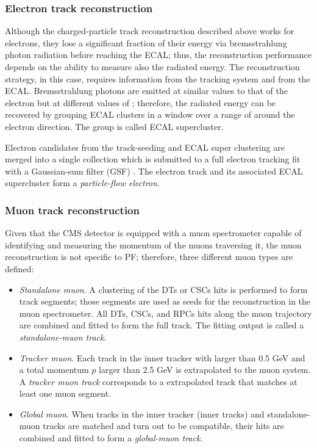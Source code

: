 \subsubsection*{Electron track reconstruction}

Although the charged-particle track reconstruction described above works for electrons, they lose a significant fraction of their energy via bremsstrahlung photon radiation before reaching the ECAL; thus, the reconstruction performance depends on the ability to measure also the radiated energy. The reconstruction strategy, in this case, requires information from the tracking system and from the ECAL. Bremsstrahlung photons are emitted at similar \etac values to that of the electron but at different values of \phic; therefore, the radiated energy can be recovered by grouping ECAL clusters in a \etac window over a range of \phic around the electron direction. The group is called ECAL supercluster.

Electron candidates from the track-seeding and ECAL super clustering are merged into a single collection which is submitted to a full electron tracking fit with a Gaussian-sum filter (GSF) \cite{gsf}. The electron track and its associated ECAL supercluster form a \textit{particle-flow electron}.

\subsubsection*{Muon track reconstruction}

Given that the CMS detector is equipped with a muon spectrometer capable of identifying and measuring the momentum of the muons traversing it, the muon reconstruction is not specific to PF; therefore, three different muon types are defined:

\begin{itemize}
\item \textit{Standalone muon}. A clustering of the DTs or CSCs hits is performed to form track segments; those segments are used as seeds for the reconstruction in the muon spectrometer. All DTs, CSCs, and RPCs hits along the muon trajectory are combined and fitted to form the full track. The fitting output is called a \textit{standalone-muon track}.
\item \textit{Tracker muon}. Each track in the inner tracker with \pt larger than 0.5 GeV and a total momentum $p$ larger than 2.5 GeV is extrapolated to the muon system. A \textit{tracker muon track} corresponds to a extrapolated track that matches at least one muon segment.
\item \textit{Global muon}. When tracks in the inner tracker (inner tracks) and standalone-muon tracks are matched and turn out to be compatible, their hits are combined and fitted to form a \textit{global-muon track}. 
\end{itemize}

